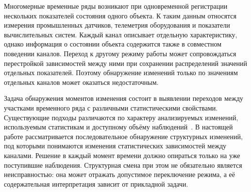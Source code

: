 \documentclass[bachelor, och, diploma]{SCWorks}
\begin{document}

\date{2027}

\maketitle

\secNumbering

\tableofcontents




\intro

Многомерные временные ряды возникают при одновременной регистрации нескольких показателей состояния одного объекта. К таким данным относятся измерения промышленных датчиков, телеметрия оборудования и показатели вычислительных систем. Каждый канал описывает отдельную характеристику, однако информация о состоянии объекта содержится также в совместном поведении каналов. Переход к другому режиму работы может сопровождаться перестройкой зависимостей между ними при сохранении распределений значений отдельных показателей. Поэтому обнаружение изменений только по значениям отдельных каналов может оказаться недостаточным.

Задача обнаружения моментов изменения состоит в выявлении переходов между участками временного ряда с различными статистическими свойствами. Существующие подходы различаются по характеру анализируемых изменений, используемым статистикам и доступному объёму наблюдений~\cite{truong2020review}. В настоящей работе рассматривается последовательное обнаружение структурных изменений, под которыми понимаются изменения статистических зависимостей между каналами. Решение в каждый момент времени должно опираться только на уже поступившие наблюдения. Структурная смена при этом не обязательно является неисправностью: она может отражать допустимое переключение режима, а её содержательная интерпретация зависит от прикладной задачи.
\end{document}
